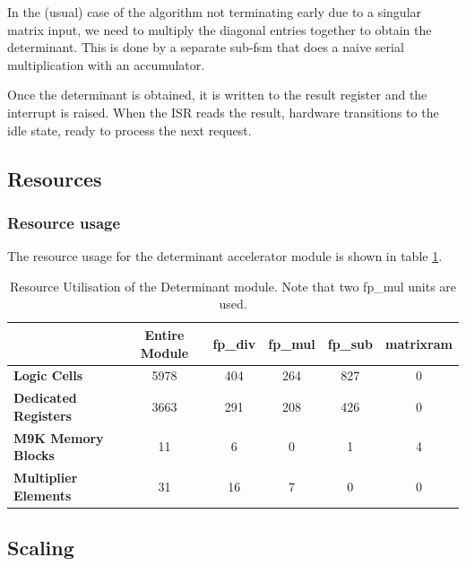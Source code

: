 \documentclass[]{article}
\begin{document}
In the (usual) case of the algorithm not terminating early due to a singular matrix input, we need to multiply the diagonal entries together to obtain the determinant. This is done by a separate sub-fsm that does a naive serial multiplication with an accumulator. 

Once the determinant is obtained, it is written to the result register and the interrupt is raised. When the ISR reads the result, hardware transitions to the idle state, ready to process the next request.

\subsection{Resources} %
\label{sub:resources}

\subsubsection{Resource usage} %
\label{sub:resource_usage}

The resource usage for the determinant accelerator module is shown in table \ref{tab:resource_util_det}.

\begin{table}[htbp]
	\caption{Resource Utilisation of the Determinant module. Note that two fp\_mul units are used.}
	\label{tab:resource_util_det}
	\begin{center}
		\begin{tabular}{l|ccccc}
		\hline

		\hline
											& \textbf{Entire Module} 	& \textbf{fp\_div} 		& \textbf{fp\_mul}	& \textbf{fp\_sub} 	& \textbf{matrixram} \\
		\hline
			\textbf{Logic Cells} 			& 5978						& 404 					& 264 				& 827 				& 0 \\
			\textbf{Dedicated Registers}	& 3663						& 291 					& 208 				& 426				& 0 \\
			\textbf{M9K Memory Blocks}		& 11						& 6 					& 0 				& 1 				& 4 \\
			\textbf{Multiplier Elements}	& 31						& 16 					& 7 				& 0					& 0 \\
		\hline

		\hline
		\end{tabular}
	\end{center}
\end{table}

\subsection{Scaling} %
\label{sub:scaling}
\end{document}
